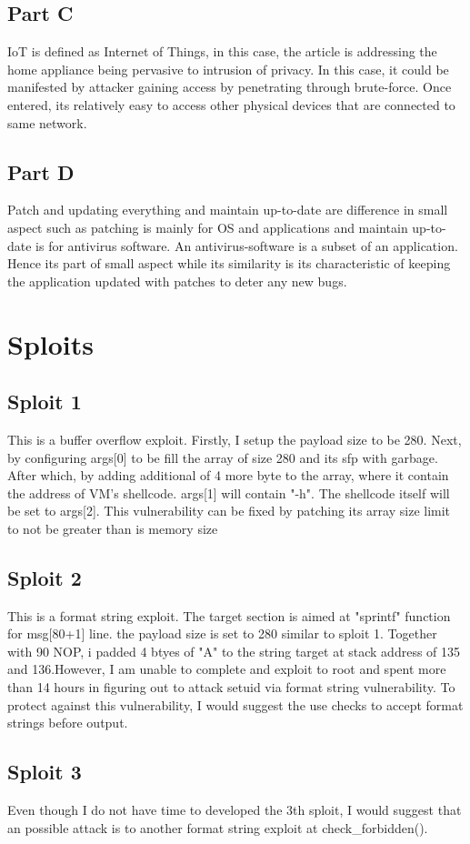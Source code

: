 \documentclass[12pt]{article}
\begin{document}
\subsection*{Part C}
IoT is defined as Internet of Things, in this case, the article is addressing the home appliance being pervasive to intrusion of privacy. In this case, it could be manifested by attacker gaining access by penetrating through brute-force. Once entered, its relatively easy to access other physical devices that are connected to same network. 

\subsection*{Part D}
Patch and updating everything and maintain up-to-date are difference in small aspect such as patching is mainly for OS and applications and maintain up-to-date is for antivirus software. An antivirus-software is a subset of an application. Hence its part of small aspect while its similarity is its characteristic of keeping the application updated with patches to deter any new bugs. 

\section*{Sploits}
\subsection*{Sploit 1}
This is a buffer overflow exploit. Firstly, I setup the payload size to be 280. Next, by configuring args[0] to be fill the array of size 280 and its sfp with garbage. After which, by adding additional of 4 more byte to the array, where it contain the address of VM's shellcode. args[1] will contain "-h". The shellcode itself will be set to args[2].  This vulnerability can be fixed by patching its array size limit to not be greater than is memory size

\subsection*{Sploit 2}
This is a format string exploit. 
The target section is aimed at "sprintf" function for msg[80+1] line. the payload size is set to 280 similar to sploit 1. Together with 90 NOP, i padded 4 btyes of "A" to the string target at stack address of 135 and 136.However, I am unable to complete and exploit to root and spent more than 14 hours in figuring out to attack setuid via format string vulnerability. To protect against this vulnerability, I would suggest the use checks to accept format strings before output.

\subsection*{Sploit 3}
Even though I do not have time to developed the 3th sploit, I would suggest that an possible attack is to another format string exploit at check_forbidden(). 

 
\end{document}
